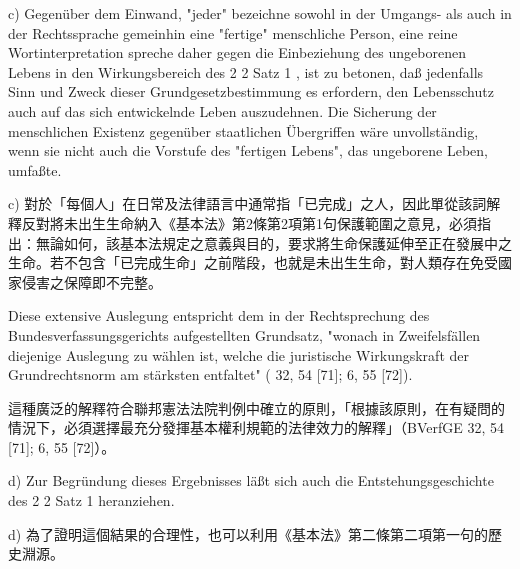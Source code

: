 \documentclass[12pt]{article}
\begin{document}
\syncleft
\begin{sourcepara}
c) Gegenüber dem Einwand, "jeder" bezeichne sowohl in der Umgangs- als auch in der Rechtssprache gemeinhin eine "fertige" menschliche Person, eine reine Wortinterpretation spreche daher gegen die Einbeziehung des ungeborenen Lebens in den Wirkungsbereich des \abbrArt{} 2 \abbrAbs{} 2 Satz 1 \abbrGG{}\ggfnArtTwoTwoOneDE{}, ist zu betonen, daß jedenfalls Sinn und Zweck dieser Grundgesetzbestimmung es erfordern, den Lebensschutz auch auf das sich entwickelnde Leben auszudehnen. Die Sicherung der menschlichen Existenz gegenüber staatlichen Übergriffen wäre unvollständig, wenn sie nicht auch die Vorstufe des "fertigen Lebens", das ungeborene Leben, umfaßte.
\end{sourcepara}
\begin{transpara}
c) 對於「每個人」在日常及法律語言中通常指「已完成」之人，因此單從該詞解釋反對將未出生生命納入《基本法》第2條第2項第1句\ggfnArtTwoTwoOneZH{}保護範圍之意見，必須指出：無論如何，該基本法規定之意義與目的，要求將生命保護延伸至正在發展中之生命。若不包含「已完成生命」之前階段，也就是未出生生命，對人類存在免受國家侵害之保障即不完整。
\end{transpara}

\syncleft
\begin{sourcepara}
Diese extensive Auslegung entspricht dem in der Rechtsprechung des Bundesverfassungsgerichts aufgestellten Grundsatz, "wonach in Zweifelsfällen diejenige Auslegung zu wählen ist, welche die juristische Wirkungskraft der Grundrechtsnorm am stärksten entfaltet" (\abbrBVerfGE{} 32, 54 [71]; 6, 55 [72]).
\end{sourcepara}
\begin{transpara}
這種廣泛的解釋符合聯邦憲法法院判例中確立的原則，「根據該原則，在有疑問的情況下，必須選擇最充分發揮基本權利規範的法律效力的解釋」（BVerfGE 32, 54 [71]; 6, 55 [72]）。
\end{transpara}

\syncleft
\begin{sourcepara}
d) Zur Begründung dieses Ergebnisses läßt sich auch die Entstehungsgeschichte des \abbrArt{} 2 \abbrAbs{} 2 Satz 1 \abbrGG{}\ggfnArtTwoTwoOneDE{} heranziehen.
\end{sourcepara}
\begin{transpara}
d) 為了證明這個結果的合理性，也可以利用《基本法》第二條第二項第一句\ggfnArtTwoTwoOneZH{}的歷史淵源。
\end{transpara}
\end{document}

